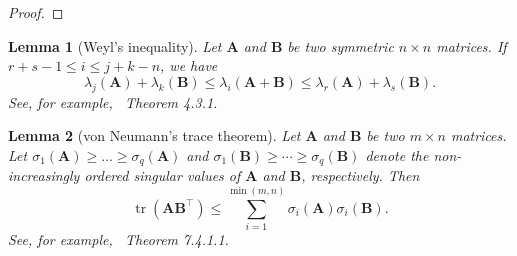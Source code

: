 \documentclass[12pt]{article} %
\DeclareMathOperator{\mytr}{tr}
\newcommand{\bA}{\mathbf{A}}
\newcommand{\bB}{\mathbf{B}}
\newtheorem{lemma}{Lemma}
\theoremstyle{definition}
\begin{document}
\begin{appendices}
\begin{proof}
 
\end{proof}

    \begin{lemma}[Weyl's inequality]
        Let $\bA$ and $\bB$ be two symmetric $n\times n$ matrices. If $r+s-1\leq i \leq j+k-n$, we have
        $$
        \lambda_j(\bA) +\lambda_k(\bB)\leq \lambda_i (\bA+\bB) \leq
        \lambda_r(\bA)+\lambda_s(\bB).
        $$
        See, for example,~\citet{Horn1985Matrix} Theorem 4.3.1.
\end{lemma}
\begin{lemma}[von Neumann's trace theorem]
    Let $\bA$ and $\bB$ be two $m\times n$ matrices. Let $\sigma_1(\bA)\geq \ldots \geq \sigma_q (\bA)$ and $\sigma_1(\bB)\geq \cdots \geq \sigma_q (\bB)$ denote the non-increasingly ordered singular values of $\bA$ and $\bB$, respectively. Then
    \begin{equation*}
        \mytr(\bA \bB^\top)\leq \sum_{i=1}^{\min(m,n)}\sigma_i(\bA)\sigma_i(\bB).
    \end{equation*}
    See, for example,~\citet{Horn1985Matrix} Theorem 7.4.1.1.
\end{lemma}


\end{appendices}
\end{document}
